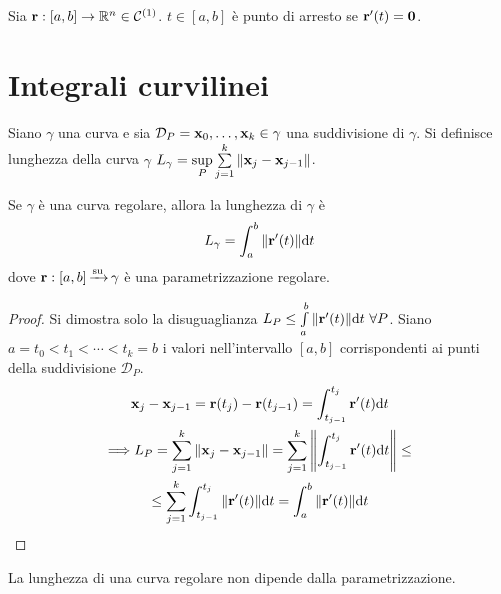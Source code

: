 \begin{definition}
	Sia $\vb{r} :[a,b] \to \mathbb{R}^n\in \mathcal{C}^{(1)}$. $t \in [a,b]$ è punto di arresto se $\vb{r}'(t) = \vb{0}$.
\end{definition}

\section{Integrali curvilinei}

\begin{definition}
	Siano $\gamma$ una curva e sia $\mathcal{D}_P=\vb{x}_0,\dots,\vb{x}_k\in \gamma$ una suddivisione di $\gamma$. Si definisce lunghezza della curva $\gamma$ $L_\gamma = \sup\limits_{P}\sum\limits_{j=1}^{k}\norm{\vb{x}_j-\vb{x}_{j-1}}$.
\end{definition}

\begin{theorem}
	Se $\gamma$ è una curva regolare, allora la lunghezza di $\gamma$ è
	$$
		L_\gamma = \int_a^b\norm{\vb{r}'(t)}\dd t
	$$
	dove $\vb{r}: [a,b]\operatorname{\xrightarrow{\operatorname{su}}} \gamma$ è una parametrizzazione regolare.
\end{theorem}

\begin{proof}
	Si dimostra solo la disuguaglianza $L_P \leq \int\limits_{a}^{b}\norm{\vb{r}'(t)}\dd t \ \forall P$. Siano $a=t_0<t_1<\cdots<t_k=b$ i valori nell'intervallo $[a,b]$ corrispondenti ai punti della suddivisione $\mathcal{D}_P$.
	\begin{gather*}
		\vb{x}_j-\vb{x}_{j-1}=\vb{r}(t_j)-\vb{r}(t_{j-1})=\int_{t_{j-1}}^{t_j}\vb{r}'(t)\dd t\\
		\Longrightarrow L_P=\sum_{j=1}^{k}\norm{\vb{x}_j-\vb{x}_{j-1}}=\sum_{j=1}^{k}\norm{\int_{t_{j-1}}^{t_j}\vb{r}'(t)\dd t}\leq\\
		\leq\sum_{j=1}^{k}\int_{t_{j-1}}^{t_j}\norm{\vb{r}'(t)}\dd t=\int_{a}^{b}\norm{\vb{r}'(t)}\dd t
	\end{gather*}
\end{proof}

\begin{prop}
	La lunghezza di una curva regolare non dipende dalla parametrizzazione.
\end{prop}

